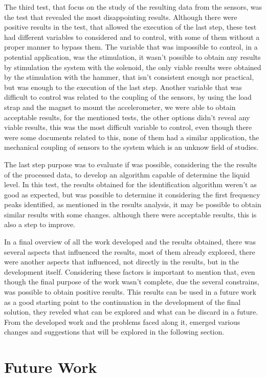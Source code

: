 The third test, that focus on the study of the resulting data from the sensors, was the test that revealed the most disappointing results. Although there were positive results in the test, that allowed the execution of the last step, these test had different variables to considered and to control, with some of them without a proper manner to bypass them. The variable that was impossible to control, in a potential application, was the stimulation, it wasn't possible to obtain any results by stimulation the system with the solenoid, the only viable results were obtained by the stimulation with the hammer, that isn't consistent enough nor practical, but was enough to the execution of the last step. Another variable that was difficult to control was related to the coupling of the sensors, by using the load strap and the magnet to mount the accelerometer, we were able to obtain acceptable results, for the mentioned tests, the other options didn't reveal any viable results, this was the most difficult variable to control, even though there were some documents related to this, none of them had a similar application, the mechanical coupling of sensors to the system which is an unknow field of studies. 

The last step purpose was to evaluate if was possible, considering the the results of the processed data, to develop an algorithm capable of determine the liquid level. In this test, the results obtained for the identification algorithm weren't as good as expected, but was possible to determine it considering the first frequency peaks identified, as mentioned in the results analysis, it may be possible to obtain similar results with some changes. although there were acceptable results, this is also a step to improve.

In a final overview of all the work developed and the results obtained, there was several aspects that influenced the results, most of them already explored, there were another aspects that influenced, not directly in the results, but in the development itself. Considering these factors is important to mention that, even though the final purpose of the work wasn't complete, due the several constrains, was possible to obtain positive results. This results can be used in a future work as a good starting point to the continuation in the development of the final solution, they reveled what can be explored and what can be discard in a future. From the developed work and the problems faced along it, emerged various changes and suggestions that will be explored in the following section. 
\section{Future Work}
